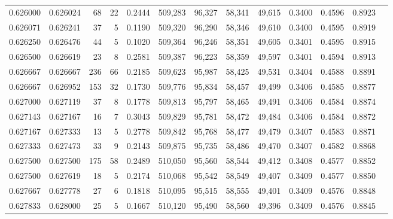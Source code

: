 \begin{tabular}{rrrrrrrrrrrrr}
0.626000 & 0.626024 &    68 &  22 &                                     0.2444 & 509,283 &  96,327 &  58,341 &  49,615 & 0.3400 & 0.4596 & 0.8923 \\
0.626071 & 0.626241 &    37 &   5 &                                     0.1190 & 509,320 &  96,290 &  58,346 &  49,610 & 0.3400 & 0.4595 & 0.8919 \\
0.626250 & 0.626476 &    44 &   5 &                                     0.1020 & 509,364 &  96,246 &  58,351 &  49,605 & 0.3401 & 0.4595 & 0.8915 \\
0.626500 & 0.626619 &    23 &   8 &                                     0.2581 & 509,387 &  96,223 &  58,359 &  49,597 & 0.3401 & 0.4594 & 0.8913 \\
0.626667 & 0.626667 &   236 &  66 &                                     0.2185 & 509,623 &  95,987 &  58,425 &  49,531 & 0.3404 & 0.4588 & 0.8891 \\
0.626667 & 0.626952 &   153 &  32 &                                     0.1730 & 509,776 &  95,834 &  58,457 &  49,499 & 0.3406 & 0.4585 & 0.8877 \\
0.627000 & 0.627119 &    37 &   8 &                                     0.1778 & 509,813 &  95,797 &  58,465 &  49,491 & 0.3406 & 0.4584 & 0.8874 \\
0.627143 & 0.627167 &    16 &   7 &                                     0.3043 & 509,829 &  95,781 &  58,472 &  49,484 & 0.3406 & 0.4584 & 0.8872 \\
0.627167 & 0.627333 &    13 &   5 &                                     0.2778 & 509,842 &  95,768 &  58,477 &  49,479 & 0.3407 & 0.4583 & 0.8871 \\
0.627333 & 0.627473 &    33 &   9 &                                     0.2143 & 509,875 &  95,735 &  58,486 &  49,470 & 0.3407 & 0.4582 & 0.8868 \\
0.627500 & 0.627500 &   175 &  58 &                                     0.2489 & 510,050 &  95,560 &  58,544 &  49,412 & 0.3408 & 0.4577 & 0.8852 \\
0.627500 & 0.627619 &    18 &   5 &                                     0.2174 & 510,068 &  95,542 &  58,549 &  49,407 & 0.3409 & 0.4577 & 0.8850 \\
0.627667 & 0.627778 &    27 &   6 &                                     0.1818 & 510,095 &  95,515 &  58,555 &  49,401 & 0.3409 & 0.4576 & 0.8848 \\
0.627833 & 0.628000 &    25 &   5 &                                     0.1667 & 510,120 &  95,490 &  58,560 &  49,396 & 0.3409 & 0.4576 & 0.8845 \\

\end{tabular}
